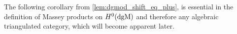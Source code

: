 


The following corollary from \autoref{lem:dgmod_shift_eq_plus}, is essential in the definition of Massey products on \( H^0(\operatorname{dgM}) \) and therefore any algebraic triangulated category, which will become apparent later.

